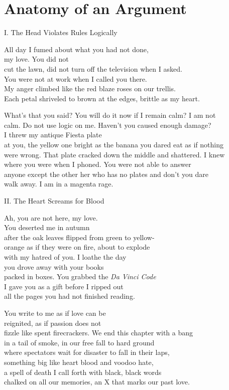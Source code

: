 \documentclass[twoside,10pt]{book}
\begin{document}
\clearpage
\section{Anatomy of an Argument}

I.  The Head Violates Rules Logically

All day I fumed about what you had not done,\\
my love. You did not\\
cut the lawn, did not turn off the television when I asked.\\
You were not at work when I called you there.\\
My anger climbed like the red blaze roses on our trellis.\\
Each petal shriveled to brown at the edges, brittle as my heart.

What's that you said? You will do it now if I remain calm? I am not\\
calm. Do not use logic on me. Haven't you caused enough damage?\\
I threw my antique Fiesta plate\\
at you, the yellow one bright as the banana you dared eat as if
nothing\\
were wrong. That plate cracked down the middle and shattered. I knew\\
where you were when I phoned. You were not able to answer\\
anyone except the other her who has no plates and don't you dare\\
walk away. I am in a magenta rage.

II.  The Heart Screams for Blood

Ah, you are not here, my love.\\
You deserted me in autumn\\
after the oak leaves flipped from green to yellow-\\
orange as if they were on fire, about to explode\\
with my hatred of you. I loathe the day\\
you drove away with your books\\
packed in boxes. You grabbed the \emph{Da Vinci Code}\\
I gave you as a gift before I ripped out\\
all the pages you had not finished reading.

You write to me as if love can be\\
reignited, as if passion does not\\
fizzle like spent firecrackers. We end this chapter with a bang\\
in a tail of smoke, in our free fall to hard ground\\
where spectators wait for disaster to fall in their laps,\\
something big like heart blood and voodoo hate,\\
a spell of death I call forth with black, black words\\
chalked on all our memories, an X that marks our past love.
\end{document}
